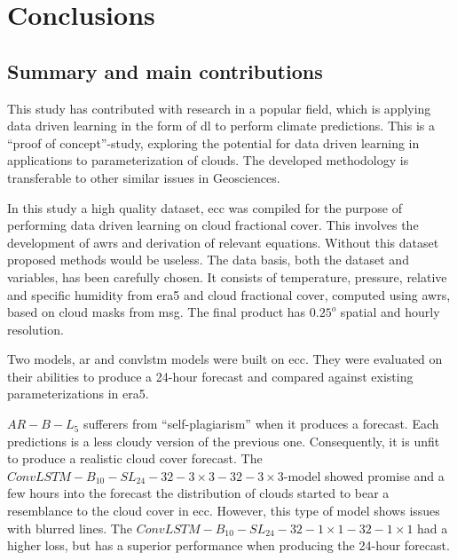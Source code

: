 \chapter{Conclusions}
\section{Summary and main contributions}
This study has contributed with research in a popular field, which is applying data driven learning in the form of \acrshort{dl} to perform climate predictions.
This is a ``proof of concept''-study, exploring the potential for data driven learning in applications to parameterization of clouds. The developed methodology is transferable to other similar issues in Geosciences.

In this study a high quality dataset, \acrfull{ecc} was compiled for the purpose of performing data driven learning on cloud fractional cover. This involves the development of \acrfull{awrs} and derivation of relevant equations. Without this dataset proposed methods would be useless. The data basis, both the dataset and variables, has been carefully chosen. It consists of temperature, pressure, relative and specific humidity from \acrshort{era5} and cloud fractional cover, computed using \acrshort{awrs}, based on cloud masks from \acrshort{msg}. The final product has $0.25^o$ spatial and hourly resolution.

Two models, \acrfull{ar} and \acrfull{convlstm} models were built on \acrshort{ecc}. They were evaluated on their abilities to produce a 24-hour forecast and compared against existing parameterizations in \acrshort{era5}. 

$AR-B-L_5$ sufferers from ``self-plagiarism'' when it produces a forecast. Each predictions is a less cloudy version of the previous one. Consequently, it is unfit to produce a realistic cloud cover forecast.  The $ConvLSTM-B_{10}-SL_{24}-32-3\times3-32-3 \times3$-model showed promise and a few hours into the forecast the distribution of clouds started to bear a resemblance to the cloud cover in \acrshort{ecc}. However, this type of model shows issues with blurred lines. 
The $ConvLSTM-B_{10}-SL_{24}-32-1\times1-32-1 \times1$ had a higher loss, but has
a superior performance when producing the 24-hour forecast.

